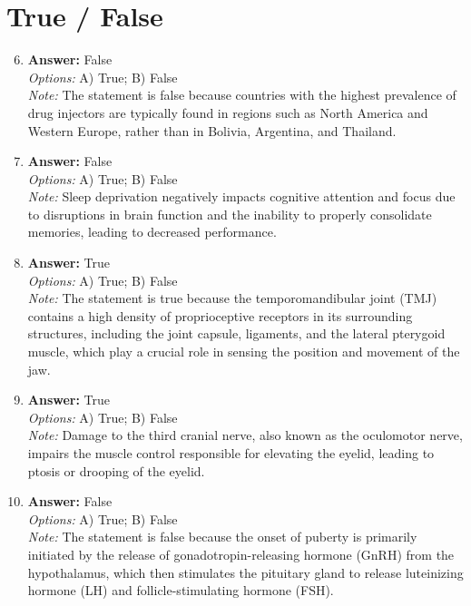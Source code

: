 \documentclass[12pt]{article}
\begin{document}
\section*{True / False}
\begin{enumerate}[label=\arabic*.]
\setcounter{enumi}{5}
\item \textbf{Answer:} False
\\ \textit{Options:} A) True; B) False
\\ \textit{Note:} The statement is false because countries with the highest prevalence of drug injectors are typically found in regions such as North America and Western Europe, rather than in Bolivia, Argentina, and Thailand.
\item \textbf{Answer:} False
\\ \textit{Options:} A) True; B) False
\\ \textit{Note:} Sleep deprivation negatively impacts cognitive attention and focus due to disruptions in brain function and the inability to properly consolidate memories, leading to decreased performance.
\item \textbf{Answer:} True
\\ \textit{Options:} A) True; B) False
\\ \textit{Note:} The statement is true because the temporomandibular joint (TMJ) contains a high density of proprioceptive receptors in its surrounding structures, including the joint capsule, ligaments, and the lateral pterygoid muscle, which play a crucial role in sensing the position and movement of the jaw.
\item \textbf{Answer:} True
\\ \textit{Options:} A) True; B) False
\\ \textit{Note:} Damage to the third cranial nerve, also known as the oculomotor nerve, impairs the muscle control responsible for elevating the eyelid, leading to ptosis or drooping of the eyelid.
\item \textbf{Answer:} False
\\ \textit{Options:} A) True; B) False
\\ \textit{Note:} The statement is false because the onset of puberty is primarily initiated by the release of gonadotropin-releasing hormone (GnRH) from the hypothalamus, which then stimulates the pituitary gland to release luteinizing hormone (LH) and follicle-stimulating hormone (FSH).
\end{enumerate}
\end{document}
